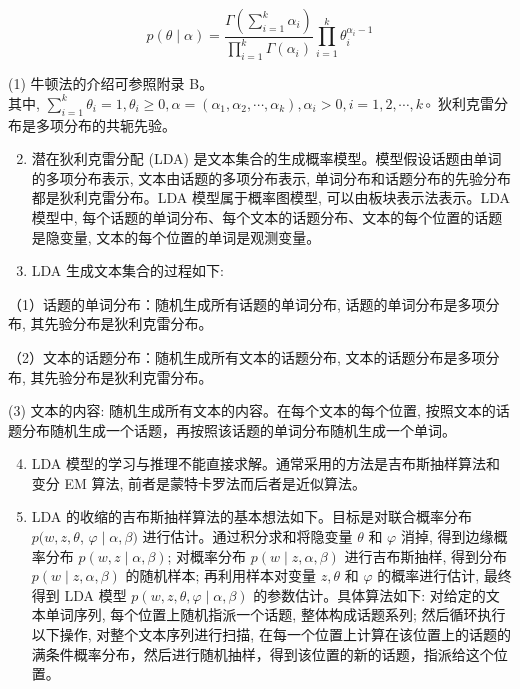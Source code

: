 \documentclass[10pt]{article}
\begin{document}
\begin{CJK*}{UTF8}{bsmi}
$$
p(\theta \mid \alpha)=\frac{\Gamma\left(\sum_{i=1}^{k} \alpha_{i}\right)}{\prod_{i=1}^{k} \Gamma\left(\alpha_{i}\right)} \prod_{i=1}^{k} \theta_{i}^{\alpha_{i}-1}
$$

(1) 牛顿法的介绍可参照附录 B。\\
其中, $\sum_{i=1}^{k} \theta_{i}=1, \theta_{i} \geqslant 0, \alpha=\left(\alpha_{1}, \alpha_{2}, \cdots, \alpha_{k}\right), \alpha_{i}>0, i=1,2, \cdots, k \circ$ 狄利克雷分布是多项分布的共轭先验。

\begin{enumerate}
  \setcounter{enumi}{1}
  \item 潜在狄利克雷分配 (LDA) 是文本集合的生成概率模型。模型假设话题由单词的多项分布表示, 文本由话题的多项分布表示, 单词分布和话题分布的先验分布都是狄利克雷分布。LDA 模型属于概率图模型, 可以由板块表示法表示。LDA 模型中, 每个话题的单词分布、每个文本的话题分布、文本的每个位置的话题是隐变量, 文本的每个位置的单词是观测变量。

  \item LDA 生成文本集合的过程如下:

\end{enumerate}

（1）话题的单词分布：随机生成所有话题的单词分布, 话题的单词分布是多项分布, 其先验分布是狄利克雷分布。

（2）文本的话题分布：随机生成所有文本的话题分布, 文本的话题分布是多项分布, 其先验分布是狄利克雷分布。

(3) 文本的内容: 随机生成所有文本的内容。在每个文本的每个位置, 按照文本的话题分布随机生成一个话题，再按照该话题的单词分布随机生成一个单词。

\begin{enumerate}
  \setcounter{enumi}{3}
  \item LDA 模型的学习与推理不能直接求解。通常采用的方法是吉布斯抽样算法和变分 EM 算法, 前者是蒙特卡罗法而后者是近似算法。

  \item LDA 的收缩的吉布斯抽样算法的基本想法如下。目标是对联合概率分布 $p(w, z, \theta$, $\varphi \mid \alpha, \beta)$ 进行估计。通过积分求和将隐变量 $\theta$ 和 $\varphi$ 消掉, 得到边缘概率分布 $p(w, z \mid \alpha, \beta)$; 对概率分布 $p(w \mid z, \alpha, \beta)$ 进行吉布斯抽样, 得到分布 $p(w \mid z, \alpha, \beta)$ 的随机样本; 再利用样本对变量 $z, \theta$ 和 $\varphi$ 的概率进行估计, 最终得到 LDA 模型 $p(w, z, \theta, \varphi \mid \alpha, \beta)$ 的参数估计。具体算法如下: 对给定的文本单词序列, 每个位置上随机指派一个话题, 整体构成话题系列; 然后循环执行以下操作, 对整个文本序列进行扫描, 在每一个位置上计算在该位置上的话题的满条件概率分布，然后进行随机抽样，得到该位置的新的话题，指派给这个位置。


\end{enumerate}
\end{CJK*}
\end{document}
